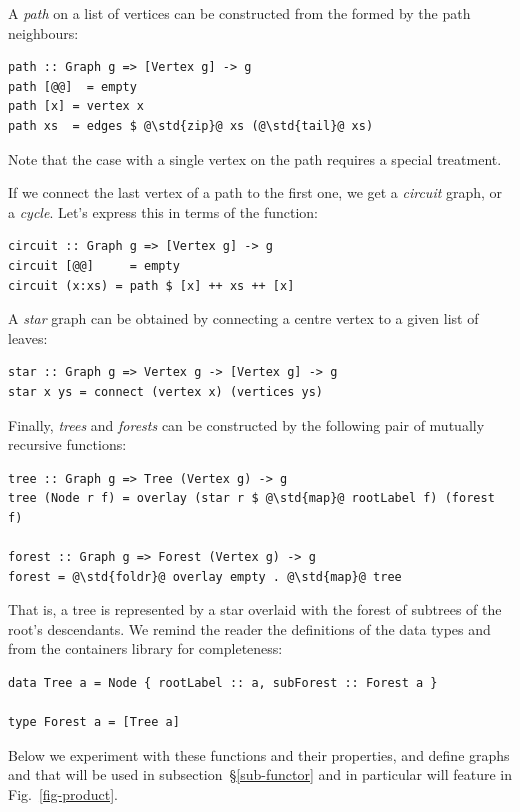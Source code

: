 A \emph{path} on a list of vertices can be constructed from the 
formed by the path neighbours:

\begin{verbatim}
path :: Graph g => [Vertex g] -> g
path [@@]  = empty
path [x] = vertex x
path xs  = edges $ @\std{zip}@ xs (@\std{tail}@ xs)
\end{verbatim}

\noindent
Note that the case with a single vertex on the path requires a special treatment.

If we connect the last vertex of a path to the first one, we get a \emph{circuit}
graph, or a \emph{cycle}. Let's express this in terms of the  function:

\begin{verbatim}
circuit :: Graph g => [Vertex g] -> g
circuit [@@]     = empty
circuit (x:xs) = path $ [x] ++ xs ++ [x]
\end{verbatim}

A \emph{star} graph can be obtained by connecting a centre vertex to a given
list of leaves:

\begin{verbatim}
star :: Graph g => Vertex g -> [Vertex g] -> g
star x ys = connect (vertex x) (vertices ys)
\end{verbatim}

Finally, \emph{trees} and \emph{forests} can be constructed by the following
pair of mutually recursive functions:

\begin{verbatim}
tree :: Graph g => Tree (Vertex g) -> g
tree (Node r f) = overlay (star r $ @\std{map}@ rootLabel f) (forest f)

forest :: Graph g => Forest (Vertex g) -> g
forest = @\std{foldr}@ overlay empty . @\std{map}@ tree
\end{verbatim}

\noindent
That is, a tree is represented by a star overlaid with the forest
of subtrees of the root's descendants. We remind the reader the
definitions of the data types  and  from the
\textsf{containers} library for completeness:

\begin{verbatim}
data Tree a = Node { rootLabel :: a, subForest :: Forest a }

type Forest a = [Tree a]
\end{verbatim}

Below we experiment with these functions and their properties, and define
graphs  and  that will be used in subsection~\S\ref{sub-functor}
and in particular will feature in Fig.~\ref{fig-product}.

